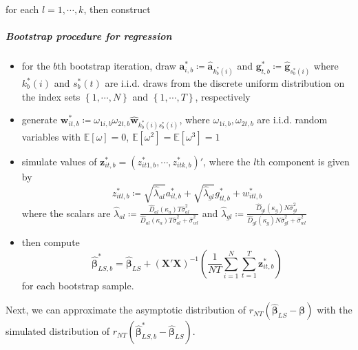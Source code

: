 \documentclass[twoside]{article}
\begin{document}
for each $l=1,\cdots,k$, then construct
\subparagraph*{Bootstrap procedure for regression}
\begin{itemize}
    \item for the $b$th bootstrap iteration, draw $\mathbf{a}^*_{i,b}\coloneq \hat{\mathbf{a}}_{k^*_b(i)}$ and $\mathbf{g}^*_{t,b}\coloneq \hat{\mathbf{g}}_{s^*_b(i)}$ where $k^*_b(i)$ and $s^*_b(t)$ are i.i.d. draws from the discrete uniform distribution on the index sets $\left\{1,\cdots,N\right\}$ and $\left\{1,\cdots,T\right\}$, respectively
    \item generate $\mathbf{w}^*_{it,b} \coloneq \omega_{1i,b}\omega_{2t,b} \hat{\mathbf{w}}_{k^*_b(i)s^*_b(i)}$, where $\omega_{1i,b},\omega_{2t,b}$ are i.i.d. random variables with $\mathbb{E}\left[\omega\right] =0$, $\mathbb{E}[\omega^2]=\mathbb{E}[\omega^3]=1$
    \item simulate values of $\mathbf{z}^*_{it,b}=\left(z^*_{it1,b},\cdots,z^*_{itk,b}\right)'$, where the $l$th component is given by $$ z^*_{itl,b} \coloneq \sqrt{\hat{\lambda}_{al}}a^*_{il,b}+\sqrt{\hat{\lambda}_{gl}}g^*_{tl,b} +w^*_{itl,b}$$
    where the scalars are $\hat{\lambda}_{al}\coloneq \frac{\hat{D}_{al}(\kappa_a)T\hat{\sigma}^2_{al}}{\hat{D}_{al}(\kappa_a)T\hat{\sigma}^2_{al}+\hat{\sigma}^2_{wl}}$ and $\hat{\lambda}_{gl}\coloneq \frac{\hat{D}_{gl}(\kappa_g)N\hat{\sigma}^2_{gl}}{\hat{D}_{gl}(\kappa_g)N\hat{\sigma}^2_{gl}+\hat{\sigma}^2_{wl}}$
    \item then compute $$ \hat{\boldsymbol{\beta}}^*_{LS,b} = \hat{\boldsymbol{\beta}}_{LS} + \left(\mathbf{X'X}\right)^{-1}\left( \frac{1}{NT}\sum^N_{i=1}\sum^T_{t=1}\mathbf{z}^*_{it,b} \right) $$ for each bootstrap sample.
\end{itemize}
Next, we can approximate the asymptotic distribution of $r_{NT}\left(\hat{\boldsymbol{\beta}}_{LS}-\boldsymbol{\beta}\right)$ with the simulated distribution of $r_{NT}\left(\hat{\boldsymbol{\beta}}^*_{LS,b}-\hat{\boldsymbol{\beta}}_{LS}\right)$.
\end{document}
